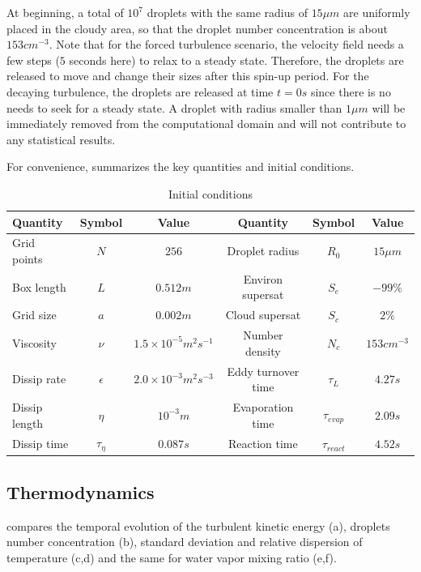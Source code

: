 At beginning, a total of $10^{7}$ droplets with the same radius of $15\mu m$
are uniformly placed in the cloudy area, so that the droplet number
concentration is about $153{cm}^{-3}$. Note that for the forced turbulence
scenario, the velocity field needs a few steps ($5$ seconds here) to relax to a
steady state. Therefore, the droplets are released to move and change their
sizes after this spin-up period. For the decaying
turbulence, the droplets are released at time $t = 0s$ since there is no needs
to seek for a steady state. A droplet with radius smaller than $1\mu m$ will be
immediately removed from the computational domain and will not contribute to
any statistical results.

For convenience,  summarizes the key quantities and initial conditions.
\begin{table}[H]
\centering
\begin{adjustbox}{max width = \textwidth}
\begin{tabular}{l c c c c c}
\hline\hline
Quantity & Symbol & Value & Quantity & Symbol & Value\\
\hline
Grid points & $N$ & $256$ & Droplet radius & $R_{0}$ & $15\mu m$\\
Box length & $L$ & $0.512m$ & Environ supersat & $S_{e}$ & $-99\%$\\
Grid size & $a$ & $0.002m$ & Cloud supersat & $S_{c}$ & $2\%$\\
Viscosity & $\nu$ & $1.5\times10^{-5}m^{2}s^{-1}$ & Number density& $N_{c}$ & $153cm^{-3}$\\
Dissip rate& $\epsilon$ & $2.0\times10^{-3}m^{2}s^{-3}$ & Eddy turnover time & $\tau_{L}$ & $4.27s$\\
Dissip length& $\eta$ & $10^{-3}m$ & Evaporation time & $\tau_{evap}$ & $2.09s$\\
Dissip time& $\tau_{\eta}$ & $0.087s$ & Reaction time & $\tau_{react}$ & $4.52s$\\
\hline
\end{tabular}
\end{adjustbox}
\caption{Initial conditions}
\label{tb:parameters}
\end{table}

\subsection{Thermodynamics}
 compares the temporal evolution of the turbulent kinetic
energy (a), droplets number concentration (b), standard deviation and relative
dispersion of temperature (c,d) and the same for water vapor mixing ratio
(e,f).

